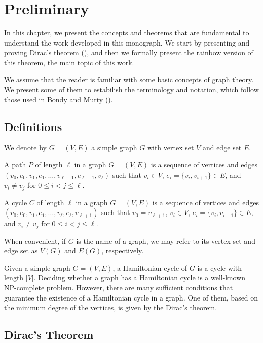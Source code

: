 
\chapter{Preliminary}

In this chapter, we present the concepts and theorems that are fundamental to understand the 
work developed in this monograph. We start by presenting and proving Dirac's theorem
(\cite{dirac1952}), 
and then we formally present the rainbow version of this theorem, the main topic of this work.

We assume that the reader is familiar with some basic concepts of graph theory. We present some 
of them to estabilish the terminology and notation, which follow those used in Bondy and Murty 
(\cite{bondy1976}).

\section{Definitions}

We denote by $G = (V, E)$ a simple graph $G$ with vertex set $V$ and edge set $E$.

A path $P$ of length $\ell$ in a graph $G = (V, E)$ is a sequence of vertices and edges $(v_0, e_0, v_1, e_1, \ldots, v_{\ell - 1}, e_{\ell - 1}, v_{\ell})$ such that
$v_i \in V$, $e_i = \{v_i, v_{i + 1}\} \in E$, and $v_i \neq v_j$ for $0 \leq i < j \leq \ell$.

A cycle $C$ of length $\ell$ in a graph $G = (V, E)$ is a sequence of vertices and edges $(v_0, e_0, v_1, e_1, \ldots, v_{\ell}, e_{\ell}, v_{\ell + 1})$ such that
$v_{0} = v_{\ell + 1}$, $v_i \in V$, $e_i = \{v_i, v_{i + 1}\} \in E$, and $v_i \neq v_j$ for $0 \leq i < j \leq \ell$.

When convenient, if $G$ is the name of a graph, we may refer to its vertex set and edge set as $V(G)$ and $E(G)$, respectively.

Given a simple graph $G = (V, E)$, a Hamiltonian cycle of $G$ is a cycle with length $|V|$.
Deciding whether a graph has a Hamiltonian cycle is a well-known NP-complete problem. 
However, there are many sufficient conditions that guarantee the existence of a Hamiltonian cycle in a graph. 
One of them, based on the minimum degree of the vertices, is given by the Dirac's theorem.

\section{Dirac's Theorem}


